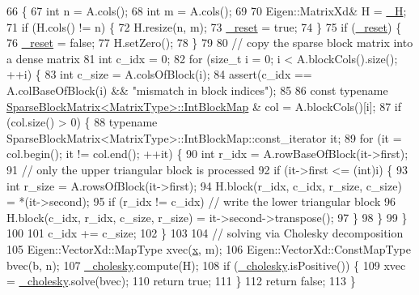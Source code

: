 \begin{DoxyCode}
66       \{
67         \textcolor{keywordtype}{int} n = A.cols();
68         \textcolor{keywordtype}{int} m = A.cols();
69 
70         Eigen::MatrixXd& H = \hyperlink{classg2o_1_1LinearSolverDense_a5ca6a1f2358ce0620dbdbae3fdc9fc99}{\_H};
71         \textcolor{keywordflow}{if} (H.cols() != n) \{
72           H.resize(n, m);
73           \hyperlink{classg2o_1_1LinearSolverDense_a2d82ac52c9c24501cccee3ef3cb575fe}{\_reset} = \textcolor{keyword}{true};
74         \}
75         \textcolor{keywordflow}{if} (\hyperlink{classg2o_1_1LinearSolverDense_a2d82ac52c9c24501cccee3ef3cb575fe}{\_reset}) \{
76           \hyperlink{classg2o_1_1LinearSolverDense_a2d82ac52c9c24501cccee3ef3cb575fe}{\_reset} = \textcolor{keyword}{false};
77           H.setZero();
78         \}
79 
80         \textcolor{comment}{// copy the sparse block matrix into a dense matrix}
81         \textcolor{keywordtype}{int} c\_idx = 0;
82         \textcolor{keywordflow}{for} (\textcolor{keywordtype}{size\_t} i = 0; i < A.blockCols().size(); ++i) \{
83           \textcolor{keywordtype}{int} c\_size = A.colsOfBlock(i);
84           assert(c\_idx == A.colBaseOfBlock(i) && \textcolor{stringliteral}{"mismatch in block indices"});
85 
86           \textcolor{keyword}{const} \textcolor{keyword}{typename} \hyperlink{classg2o_1_1SparseBlockMatrix_aaa6ca1ae454ed70f62992b6401645f4e}{SparseBlockMatrix<MatrixType>::IntBlockMap}
      & col = A.blockCols()[i];
87           \textcolor{keywordflow}{if} (col.size() > 0) \{
88             \textcolor{keyword}{typename} SparseBlockMatrix<MatrixType>::IntBlockMap::const\_iterator it;
89             \textcolor{keywordflow}{for} (it = col.begin(); it != col.end(); ++it) \{
90               \textcolor{keywordtype}{int} r\_idx = A.rowBaseOfBlock(it->first);
91               \textcolor{comment}{// only the upper triangular block is processed}
92               \textcolor{keywordflow}{if} (it->first <= (\textcolor{keywordtype}{int})i) \{
93                 \textcolor{keywordtype}{int} r\_size = A.rowsOfBlock(it->first);
94                 H.block(r\_idx, c\_idx, r\_size, c\_size) = *(it->second);
95                 \textcolor{keywordflow}{if} (r\_idx != c\_idx) \textcolor{comment}{// write the lower triangular block}
96                   H.block(c\_idx, r\_idx, c\_size, r\_size) = it->second->transpose();
97               \}
98             \}
99           \}
100 
101           c\_idx += c\_size;
102         \}
103 
104         \textcolor{comment}{// solving via Cholesky decomposition}
105         Eigen::VectorXd::MapType xvec(\hyperlink{sparse__block__matrix_8hpp_af88b946fb90d5f08b5fb740c70e98c10}{x}, m);
106         Eigen::VectorXd::ConstMapType bvec(b, n);
107         \hyperlink{classg2o_1_1LinearSolverDense_a20fc35e2f25107a6e36211861034aae0}{\_cholesky}.compute(H);
108         \textcolor{keywordflow}{if} (\hyperlink{classg2o_1_1LinearSolverDense_a20fc35e2f25107a6e36211861034aae0}{\_cholesky}.isPositive()) \{
109           xvec = \hyperlink{classg2o_1_1LinearSolverDense_a20fc35e2f25107a6e36211861034aae0}{\_cholesky}.solve(bvec);
110           \textcolor{keywordflow}{return} \textcolor{keyword}{true};
111         \}
112         \textcolor{keywordflow}{return} \textcolor{keyword}{false};
113       \}
\end{DoxyCode}


